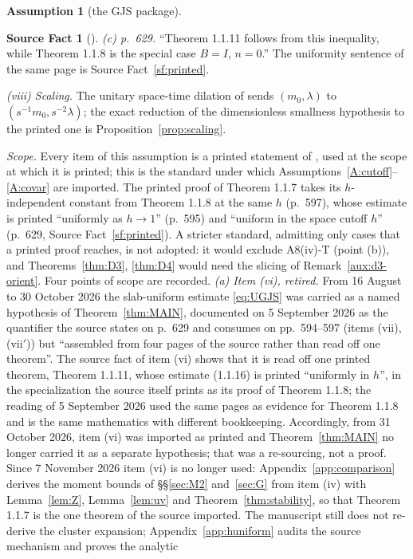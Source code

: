 \documentclass[11pt,a4paper]{article}
\theoremstyle{plain}
\theoremstyle{definition}
\newtheorem*{srcfactstar}{Source Fact}
\newtheorem{assumption}{Assumption}
\theoremstyle{plain}
\theoremstyle{definition}
\begin{document}
\begin{assumption}[the GJS package]
\begin{srcfactstar}[{\cite[pp.~594--597 and 629]{GJS}}]
\emph{(c) p.~629.}  ``Theorem 1.1.11 follows from this inequality, while Theorem 1.1.8
is the special case $B=I$, $n=0$.''  The uniformity sentence of the same page is Source
Fact~\ref{sf:printed}.
\end{srcfactstar}

\emph{(viii) Scaling.} The unitary space-time dilation of \cite[p.~590]{GJS} sends
$(m_0,\lambda)$ to $(s^{-1}m_0,s^{-2}\lambda)$; the exact reduction of the dimensionless
smallness hypothesis to the printed one is Proposition~\ref{prop:scaling}.

\emph{Scope.} Every item of this assumption is a printed statement of \cite{GJS}, used at
the scope at which it is printed; this is the standard under which
Assumptions~\ref{A:cutoff}--\ref{A:covar} are imported.  The printed proof of Theorem 1.1.7
takes its $h$-independent constant from Theorem 1.1.8 at the same $h$ (p.~597), whose
estimate is printed ``uniformly as $h\to1$'' (p.~595) and ``uniform in the space cutoff $h$''
(p.~629, Source Fact~\ref{sf:printed}).  A stricter standard, admitting only cases that a
printed proof reaches, is not adopted: it would exclude A8(iv)-T (point (b)), and
Theorems~\ref{thm:D3}, \ref{thm:D4} would need the slicing of Remark~\ref{aux:d3-orient}.
Four points of scope are recorded.
\emph{(a) Item (vi), retired.}  From 16 August to 30 October 2026 the slab-uniform estimate
\eqref{eq:UGJS} was carried as a named hypothesis of Theorem~\ref{thm:MAIN}, documented
on 5 September 2026 as the quantifier the source states on p.~629 and consumes on
pp.~594--597 (items (vii), (vii$'$)) but ``assembled from four pages of the source rather
than read off one theorem''.  The source fact of item (vi) shows that it is read off one printed theorem,
Theorem 1.1.11, whose estimate (1.1.16) is printed ``uniformly in $h$'', in the
specialization the source itself prints as its proof of Theorem 1.1.8; the reading of
5 September 2026 used the same pages as evidence for Theorem 1.1.8 and is the same
mathematics with different bookkeeping.  Accordingly, from 31 October 2026, item (vi) was
imported as printed and Theorem~\ref{thm:MAIN} no longer carried it as a separate
hypothesis; that was a re-sourcing, not a proof.  Since 7 November 2026 item (vi) is no
longer used: Appendix~\ref{app:comparison} derives the moment bounds of
\S\S\ref{sec:M2} and~\ref{sec:G} from item (iv) with Lemma~\ref{lem:Z},
Lemma~\ref{lem:uv} and Theorem~\ref{thm:stability}, so that Theorem 1.1.7 is the one
theorem of the source imported.  The manuscript still does not re-derive the cluster
expansion; Appendix~\ref{app:huniform} audits the source mechanism and proves the analytic

\end{assumption}
\end{document}
